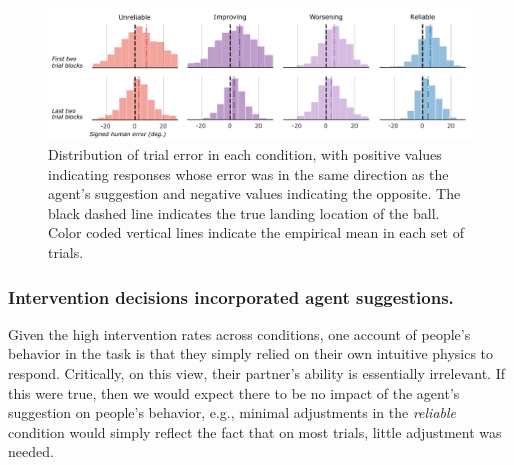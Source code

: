 \documentclass[10pt,letterpaper]{article}
\begin{document}
\begin{figure}[hbtp]
\vspace{-8mm}
\includegraphics[width=\textwidth]{img/error_distributions_clean.pdf} 
\vspace{-4mm}
\caption{Distribution of trial error in each condition, with positive values indicating responses whose error was in the same direction as the agent's suggestion and negative values indicating the opposite. The black dashed line indicates the true landing location of the ball. Color coded vertical lines indicate the empirical mean in each set of trials.} 
\label{fig:error_histograms}
\end{figure}


\subsubsection{Intervention decisions incorporated agent suggestions.}

Given the high intervention rates across conditions, one account of people's behavior in the task is that they simply relied on their own intuitive physics to respond. Critically, on this view, their partner's ability is essentially irrelevant. If this were true, then we would expect there to be no impact of the agent's suggestion on people's behavior, e.g., minimal adjustments in the \textit{reliable} condition would simply reflect the fact that on most trials, little adjustment was needed. 
\end{document}
